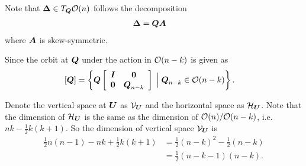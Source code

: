 \documentclass[11pt]{article}
\begin{document}
Note that $\boldsymbol{\Delta}\in T_{\boldsymbol{Q}}{\mathcal O}(n)$ follows the decomposition
\begin{align*}
\mb{\Delta} &= \mb{Q}\mb{A}%
\end{align*}
where $\boldsymbol{A}$ is skew-symmetric.%

Since the orbit at $\boldsymbol{Q}$ under the action in ${\mathcal O}(n-k)$ is given as 
\begin{align*}
\left[\boldsymbol{Q}\right] &= \left\{\boldsymbol{Q}\left[\begin{array}{cc}
\boldsymbol{I} & \boldsymbol{0} \\ 
\boldsymbol{0} & \boldsymbol{Q}_{n-k}
\end{array}\right] \;\Big|\;  \boldsymbol{Q}_{n-k}\in  {\mathcal O}(n-k) \right\}.
\end{align*}

Denote the vertical space at $\boldsymbol{U}$ as $\mathcal{V}_{\boldsymbol{U}}$ and the horizontal space as $\mathcal{H}_{\boldsymbol{U}}$. Note that the dimension of $\mathcal{H}_{\boldsymbol{U}}$ is the same as the dimension of ${\mathcal O}(n)/{\mathcal O}(n-k)$, i.e. $nk- \frac{1}{2}k(k+1)$. So the dimension of vertical space $\mathcal{V}_{\boldsymbol{U}}$ is 
\begin{align*}
\frac{1}{2}n(n-1) - nk+ \frac{1}{2}k(k+1)
&=\frac{1}{2}(n-k)^{2} - \frac{1}{2}(n -k)\\
&=\frac{1}{2}(n-k-1)(n-k).
\end{align*}
\end{document}
